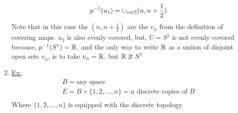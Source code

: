 \begin{enumerate}
            \begin{align*}
                p^{-1}(u_1)=\cup_{n\in \mathbb{Z}}(n,n+\frac{1}{2})\\
            \end{align*}
            Note that in this case the $(n, n+\frac{1}{2})$ are the $v_\alpha$ from the definition of
            covering maps. $u_2$ is also evenly covered, but, $U=S^{1}$ is not evenly covered because,
            $p^{-1}(S^{1})=\mathbb{R}$, and the only way to write $\mathbb{R}$ as a uniion of disjoint open sets $v_\alpha$,
            is to take $v_\alpha=\mathbb{R}$, but $\mathbb{R} \ncong S^1$
        \item \underline{Ex:}
            \begin{align*}
                B=\text{any space}\\
                E=B\times \{1,2,...,n\}=\text{n discrete copies of $B$}\\
            \end{align*}
            Where $\{1,2,...,n\}$ is equipped with the discrete topology.
    \end{enumerate}
